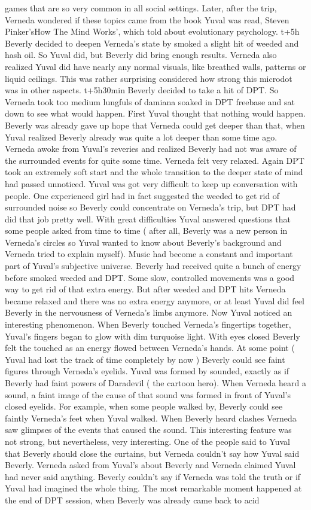 \documentclass[12pt]{book}
\begin{document}
games that are so very common in all social settings. Later, after the trip, Verneda wondered if these topics came from the book Yuval was read, Steven Pinker'sHow The Mind Works', which told about evolutionary psychology. t+5h Beverly decided to deepen Verneda's state by smoked a slight hit of weeded and hash oil. So Yuval did, but Beverly did bring enough results. Verneda also realized Yuval did have nearly any normal visuals, like breathed walls, patterns or liquid ceilings. This was rather surprising considered how strong this microdot was in other aspects. t+5h30min Beverly decided to take a hit of DPT. So Verneda took too medium lungfuls of damiana soaked in DPT freebase and sat down to see what would happen. First Yuval thought that nothing would happen. Beverly was already gave up hope that Verneda could get deeper than that, when Yuval realized Beverly already was quite a lot deeper than some time ago. Verneda awoke from Yuval's reveries and realized Beverly had not was aware of the surrounded events for quite some time. Verneda felt very relaxed. Again DPT took an extremely soft start and the whole transition to the deeper state of mind had passed unnoticed. Yuval was got very difficult to keep up conversation with people. One experienced girl had in fact suggested the weeded to get rid of surrounded noise so Beverly could concentrate on Verneda's trip, but DPT had did that job pretty well. With great difficulties Yuval answered questions that some people asked from time to time ( after all, Beverly was a new person in Verneda's circles so Yuval wanted to know about Beverly's background and Verneda tried to explain myself). Music had become a constant and important part of Yuval's subjective universe. Beverly had received quite a bunch of energy before smoked weeded and DPT. Some slow, controlled movements was a good way to get rid of that extra energy. But after weeded and DPT hits Verneda became relaxed and there was no extra energy anymore, or at least Yuval did feel Beverly in the nervousness of Verneda's limbs anymore. Now Yuval noticed an interesting phenomenon. When Beverly touched Verneda's fingertips together, Yuval's fingers began to glow with dim turquoise light. With eyes closed Beverly felt the touched as an energy flowed between Verneda's hands. At some point ( Yuval had lost the track of time completely by now ) Beverly could see faint figures through Verneda's eyelids. Yuval was formed by sounded, exactly as if Beverly had faint powers of Daradevil ( the cartoon hero). When Verneda heard a sound, a faint image of the cause of that sound was formed in front of Yuval's closed eyelids. For example, when some people walked by, Beverly could see faintly Verneda's feet when Yuval walked. When Beverly heard clashes Verneda saw glimpses of the events that caused the sound. This interesting feature was not strong, but nevertheless, very interesting. One of the people said to Yuval that Beverly should close the curtains, but Verneda couldn't say how Yuval said Beverly. Verneda asked from Yuval's about Beverly and Verneda claimed Yuval had never said anything. Beverly couldn't say if Verneda was told the truth or if Yuval had imagined the whole thing. The most remarkable moment happened at the end of DPT session, when Beverly was already came back to acid 
\end{document}
